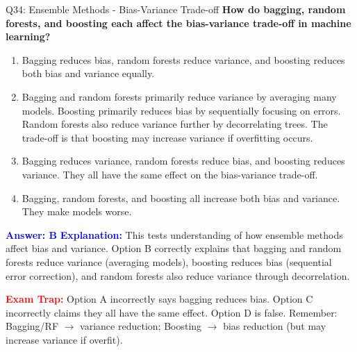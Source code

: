 \documentclass[8pt]{beamer}
\begin{document}
	\begin{frame}{Q34: Ensemble Methods - Bias-Variance Trade-off}
		\fontsize{6.5}{7.5}\selectfont
		\textbf{How do bagging, random forests, and boosting each affect the bias-variance trade-off in machine learning?}
		
		\begin{enumerate}
			\item Bagging reduces bias, random forests reduce variance, and boosting reduces both bias and variance equally.
			\item Bagging and random forests primarily reduce variance by averaging many models. Boosting primarily reduces bias by sequentially focusing on errors. Random forests also reduce variance further by decorrelating trees. The trade-off is that boosting may increase variance if overfitting occurs.
			\item Bagging reduces variance, random forests reduce bias, and boosting reduces variance. They all have the same effect on the bias-variance trade-off.
			\item Bagging, random forests, and boosting all increase both bias and variance. They make models worse.
		\end{enumerate}
		
		\vspace{0.1cm}
		\textcolor{blue}{\textbf{Answer: B}}
		\vspace{0.1cm}
		\textcolor{blue}{\textbf{Explanation:}} This tests understanding of how ensemble methods affect bias and variance. Option B correctly explains that bagging and random forests reduce variance (averaging models), boosting reduces bias (sequential error correction), and random forests also reduce variance through decorrelation.
		
		\textcolor{red}{\textbf{Exam Trap:}} Option A incorrectly says bagging reduces bias. Option C incorrectly claims they all have the same effect. Option D is false. Remember: Bagging/RF $\rightarrow$ variance reduction; Boosting $\rightarrow$ bias reduction (but may increase variance if overfit).
	\end{frame}
	
\end{document}
